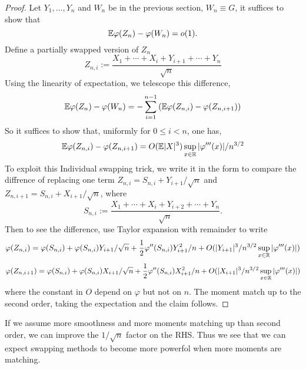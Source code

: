 \begin{proof}
    Let $Y_1,\dots,Y_n$ and $W_n$ be in the previous section, $W_n\equiv G$, it suffices to show that 
    \begin{equation*}
        \mathbb{E} \varphi (Z_n) - \varphi(W_n) = o(1).
    \end{equation*}
    Define a partially swapped version of $Z_n$
    \begin{equation*}
        Z_{n,i} := \frac{X_1+\cdots+X_i+Y_{i+1}+\cdots+Y_n}{\sqrt{n}}
    \end{equation*}
    Using the linearity of expectation, we telescope this difference,
    \begin{equation*}
        \mathbb{E} \varphi (Z_n) - \varphi(W_n) = -\sum_{i=1}^{n-1}\left( \mathbb{E} \varphi(Z_{n,i})-\varphi(Z_{n,i+1})\right)
    \end{equation*}
    So it suffices to show that, uniformly for $0\leq i <n$, one has,
    \begin{equation*}
        \mathbb{E} \varphi(Z_{n,i})-\varphi(Z_{n,i+1})=O(\mathbb{E}|X|^3)\sup_{x\in \mathbb{R}} |\varphi'''(x)|/n^{3/2}
    \end{equation*}
    To exploit this Individual swapping trick, we write it in the form to compare the diffrence of replacing one term $Z_{n,i}=S_{n,i}+Y_{i+1}/\sqrt{n}$ and $Z_{n,i+1}=S_{n,i}+X_{i+1}/\sqrt{n}$, where
    \begin{equation}\label{individual swapping trick}
        S_{n,i} := \frac{X_1+\cdots+X_i+Y_{i+2}+\cdots+Y_n}{\sqrt{n}}.
    \end{equation}
    Then to see the difference, use Taylor expansion with remainder to write 
    \begin{equation*}
        \varphi(Z_{n,i})=\varphi(S_{n,i})+\varphi(S_{n,i}) Y_{i+1}/\sqrt{n}+\frac{1}{2}\varphi''(S_{n,i})Y_{i+1}^2/n+O(|Y_{i+1}|^3/n^{3/2}\sup_{x\in \mathbb{R}}|\varphi'''(x)|)
    \end{equation*}
    \begin{equation*}
        \varphi(Z_{n,i+1})=\varphi(S_{n,i})+\varphi(S_{n,i}) X_{i+1}/\sqrt{n}+\frac{1}{2}\varphi''(S_{n,i})X_{i+1}^2/n+O(|X_{i+1}|^3/n^{3/2}\sup_{x\in \mathbb{R}}|\varphi'''(x)|)
    \end{equation*}
    where the constant in $O$ depend on $\varphi$ but not on $n$. The moment match up to the second order, taking the expectation and the claim follows.
\end{proof}

\begin{remark}
    If we assume more smoothness and more moments matching up than second order, we can improve the $1/\sqrt{n}$ factor on the RHS. Thus we see that we can expect swapping methods to become more powerfol when more moments are matching. 
\end{remark}

